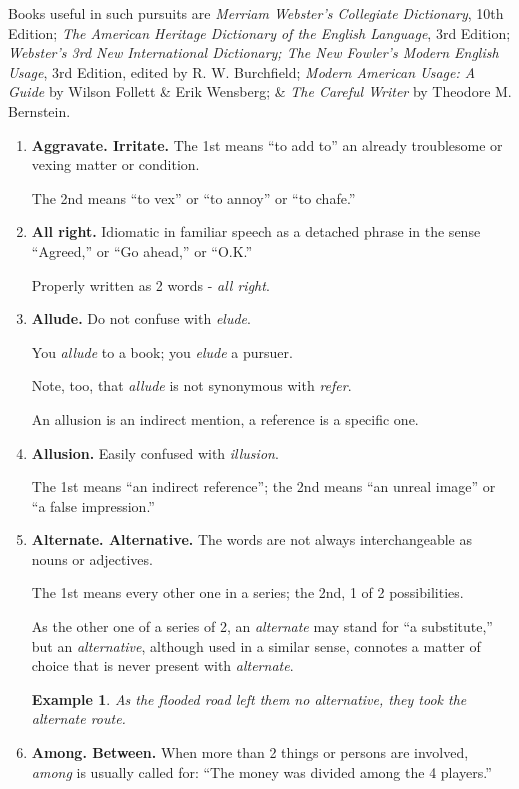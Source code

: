 \documentclass{article}
\newtheorem{example}{Example}
\begin{document}
Books useful in such pursuits are {\it Merriam Webster's Collegiate Dictionary}, 10th Edition; {\it The American Heritage Dictionary of the English Language}, 3rd Edition; {\it Webster's 3rd New International Dictionary; The New Fowler's Modern English Usage}, 3rd Edition, edited by R. W. Burchfield; {\it Modern American Usage: A Guide} by Wilson Follett \& Erik Wensberg; \& {\it The Careful Writer} by Theodore M. Bernstein.
\begin{enumerate}
	\item {\bf Aggravate. Irritate.} The 1st means ``to add to'' an already troublesome or vexing matter or condition.
	
	The 2nd means ``to vex'' or ``to annoy'' or ``to chafe.''
	\item {\bf All right.} Idiomatic in familiar speech as a detached phrase in the sense ``Agreed,'' or ``Go ahead,'' or ``O.K.''
	
	Properly written as 2 words - {\it all right}.
	\item {\bf Allude.} Do not confuse with {\it elude}.
	
	You {\it allude} to a book; you {\it elude} a pursuer.
	
	Note, too, that {\it allude} is not synonymous with {\it refer}.
	
	An allusion is an indirect mention, a reference is a specific one.
	\item {\bf Allusion.} Easily confused with {\it illusion}.
	
	The 1st means ``an indirect reference''; the 2nd means ``an unreal image'' or ``a false impression.''
	\item {\bf Alternate. Alternative.} The words are not always interchangeable as nouns or adjectives.
	
	The 1st means every other one in a series; the 2nd, 1 of 2 possibilities.
	
	As the other one of a series of 2, an {\it alternate} may stand for ``a substitute,'' but an {\it alternative}, although used in a similar sense, connotes a matter of choice that is never present with {\it alternate}.
	\begin{example}
		As the flooded road left them no alternative, they took the alternate route.
	\end{example}
	\item {\bf Among. Between.} When more than 2 things or persons are involved, {\it among} is usually called for: ``The money was divided among the 4 players.''
	

\end{enumerate}
\end{document}
